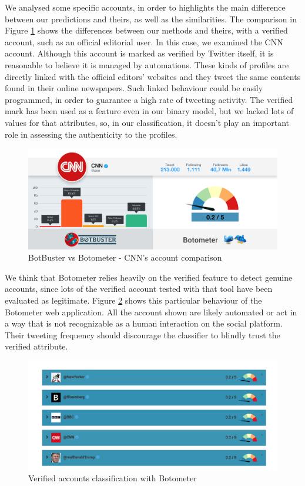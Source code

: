 We analysed some specific accounts, in order to highlights the main difference between our predictions and theirs, as well as the similarities.
The comparison in Figure \ref{fig:cnn} shows the differences between our methods and theirs, with a verified account, such as an official editorial user.
In this case, we examined the CNN account. Although this account is marked as verified by Twitter itself, it is reasonable to believe it is managed by automations. These kinds of profiles are directly linked with the official editors' websites and they tweet the same contents found in their online newspapers. Such linked behaviour could be easily programmed, in order to guarantee a high rate of tweeting activity.
The verified mark has been used as a feature even in our binary model, but we lacked lots of values for that attributes, so, in our classification, it doesn't play an important role in assessing the authenticity to the profiles.
\begin{figure}[htp!]
	\begin{center}
		\includegraphics[width=\columnwidth]{chapter7/figure/cnn.png}\par
	\end{center}
	\caption{BotBuster vs Botometer - CNN's account comparison}
	\label{fig:cnn}
\end{figure}
We think that Botometer relies heavily on the verified feature to detect genuine accounts, since lots of the verified account tested with that tool have been evaluated as legitimate. Figure \ref{fig:verified} shows this particular behaviour of the Botometer web application. All the account shown are likely automated or act in a way that is not recognizable as a human interaction on the social platform. Their tweeting frequency should discourage the classifier to blindly trust the verified attribute.
\begin{figure}[htp!]
	\begin{center}
		\includegraphics[width=\columnwidth]{chapter7/figure/verified.png}\par
	\end{center}
	\caption{Verified accounts classification with Botometer}
	\label{fig:verified}
\end{figure}
